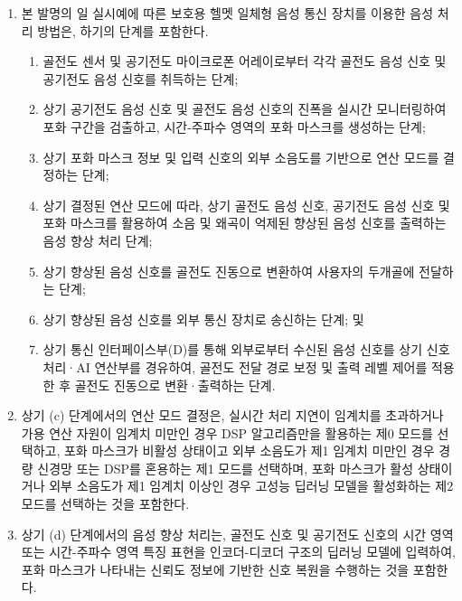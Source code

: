 \documentclass{article}
\begin{document}
\begin{enumerate}[label = \textbf{(M.1.\arabic*)}]

    \item 본 발명의 일 실시예에 따른 보호용 헬멧 일체형
    음성 통신 장치를 이용한 음성 처리 방법은, 하기의
    단계를 포함한다.

    \begin{enumerate}[label = \textbf{(\alph*)}]

        \item 골전도 센서 및 공기전도 마이크로폰 어레이로부터 각각 골전도 음성 신호 및 공기전도 음성 신호를 취득하는 단계;

        \item 상기 공기전도 음성 신호 및 골전도 음성 신호의 진폭을 실시간 모니터링하여 포화 구간을 검출하고, 시간-주파수 영역의 포화 마스크를 생성하는 단계;

        \item 상기 포화 마스크 정보 및 입력 신호의 외부 소음도를 기반으로 연산 모드를 결정하는 단계;

        \item 상기 결정된 연산 모드에 따라, 상기 골전도 음성 신호, 공기전도 음성 신호 및 포화 마스크를 활용하여 소음 및 왜곡이 억제된 향상된 음성 신호를 출력하는 음성 향상 처리 단계;

        \item 상기 향상된 음성 신호를 골전도 진동으로 변환하여 사용자의 두개골에 전달하는 단계;

        \item 상기 향상된 음성 신호를 외부 통신 장치로 송신하는 단계; 및

        \item 상기 통신 인터페이스부(D)를 통해 외부로부터 수신된 음성 신호를 상기 신호처리·AI 연산부를 경유하여, 골전도 전달 경로 보정 및 출력 레벨 제어를 적용한 후 골전도 진동으로 변환·출력하는 단계.

    \end{enumerate}

    \item 상기 (c) 단계에서의 연산 모드 결정은, 실시간 처리 지연이 임계치를 초과하거나 가용 연산 자원이 임계치 미만인 경우 DSP 알고리즘만을 활용하는 제0 모드를 선택하고, 포화 마스크가 비활성 상태이고 외부 소음도가 제1 임계치 미만인 경우 경량 신경망 또는 DSP를 혼용하는 제1 모드를 선택하며, 포화 마스크가 활성 상태이거나 외부 소음도가 제1 임계치 이상인 경우 고성능 딥러닝 모델을 활성화하는 제2 모드를 선택하는 것을 포함한다.


    \item 상기 (d) 단계에서의 음성 향상 처리는, 골전도 신호 및 공기전도 신호의 시간 영역 또는 시간-주파수 영역 특징 표현을 인코더-디코더 구조의 딥러닝 모델에 입력하여, 포화 마스크가 나타내는 신뢰도 정보에 기반한 신호 복원을 수행하는 것을 포함한다.

\end{enumerate}
\end{document}
